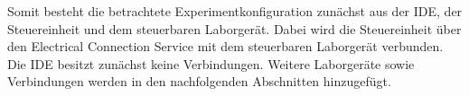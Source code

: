Somit besteht die betrachtete Experimentkonfiguration zunächst aus der IDE, der Steuereinheit und dem steuerbaren Laborgerät. Dabei wird die Steuereinheit über den Electrical Connection Service mit dem steuerbaren Laborgerät verbunden. Die IDE besitzt zunächst keine Verbindungen. Weitere Laborgeräte sowie Verbindungen werden in den nachfolgenden Abschnitten hinzugefügt.